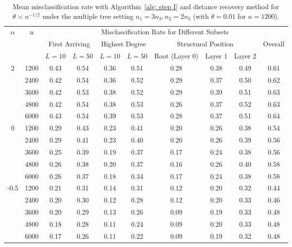 \begin{table}[tbp]
\setlength{\tabcolsep}{3.5pt}

\centering

{
\begin{tabular}{c|c|cc|cc|ccc|c}
\hline
\hline
\multirow{3}{*}{$\alpha$} & \multirow{3}{*}{n}
& \multicolumn{8}{c}{Misclassification Rate for Different Subsets} \\
\cline{3-10}
& 
& \multicolumn{2}{c|}{First Arriving}
& \multicolumn{2}{c|}{Highest Degree}
& \multicolumn{3}{c|}{Structural Position}
& \multirow{2}{*}{Overall} \\
\cline{3-9}
& 
& $L=10$ & $L=50$
& $L=10$ & $L=50$
& Root (Layer 0) & Layer 1 & Layer 2
& \\
\hline
\multirow{5}{*}{2}
& 1200 & 0.43 & 0.54 & 0.36 & 0.51 & 0.28 & 0.38 & 0.49 & 0.61 \\
& 2400 & 0.42 & 0.54 & 0.36 & 0.52 & 0.29 & 0.37 & 0.50 & 0.62 \\
& 3600 & 0.42 & 0.53 & 0.38 & 0.52 & 0.29 & 0.39 & 0.51 & 0.63 \\
& 4800 & 0.42 & 0.54 & 0.38 & 0.53 & 0.26 & 0.37 & 0.52 & 0.63 \\
& 6000 & 0.43 & 0.54 & 0.39 & 0.53 & 0.28 & 0.37 & 0.51 & 0.64 \\
\hline
\multirow{5}{*}{0}
& 1200 & 0.29 & 0.43 & 0.23 & 0.41 & 0.20 & 0.26 & 0.38 & 0.54 \\
& 2400 & 0.29 & 0.41 & 0.23 & 0.40 & 0.20 & 0.26 & 0.39 & 0.56 \\
& 3600 & 0.25 & 0.39 & 0.19 & 0.37 & 0.17 & 0.24 & 0.38 & 0.56 \\
& 4800 & 0.26 & 0.38 & 0.20 & 0.37 & 0.16 & 0.26 & 0.40 & 0.58 \\
& 6000 & 0.26 & 0.37 & 0.18 & 0.34 & 0.17 & 0.24 & 0.38 & 0.58 \\
\hline
\multirow{5}{*}{-0.5}
& 1200 & 0.21 & 0.31 & 0.14 & 0.31 & 0.12 & 0.20 & 0.32 & 0.44 \\
& 2400 & 0.20 & 0.30 & 0.12 & 0.28 & 0.12 & 0.20 & 0.33 & 0.46 \\
& 3600 & 0.20 & 0.29 & 0.13 & 0.26 & 0.09 & 0.19 & 0.33 & 0.48 \\
& 4800 & 0.18 & 0.28 & 0.11 & 0.24 & 0.09 & 0.20 & 0.33 & 0.48 \\
& 6000 & 0.17 & 0.26 & 0.11 & 0.22 & 0.09 & 0.19 & 0.32 & 0.48 \\
\hline
\hline
\end{tabular}
}


\caption{Mean misclassification rate with Algorithm~\ref{alg: step I} and distance recovery method for $\theta \asymp n^{-1/2}$ under the multiple tree setting $n_1 = 3 n_3, n_2=2 n_3$ (with $\theta=0.01$ for $n=1200$).}
\label{tab:mean_error_scale_n12 3}
\end{table}